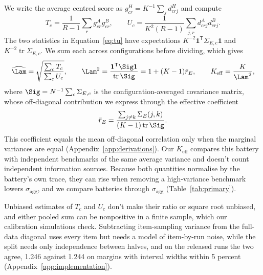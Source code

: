 We write the average centred score as $g^H_{cr}=K^{-1}\sum_j d^H_{crj}$ and compute
\begin{equation}
T_c=\frac{1}{R-1}\sum_r g^A_{cr}g^B_{cr},\qquad
U_c=\frac{1}{K^2(R-1)}\sum_{j,r}d^A_{crj}d^B_{crj}.
\label{eq:tu}
\end{equation}
The two statistics in Equation~\ref{eq:tu} have expectations $K^{-2}\mathbf{1}^{\mathsf T}\Sigma_{E,c}\mathbf{1}$ and $K^{-2}\operatorname{tr}\Sigma_{E,c}$. We sum each across configurations before dividing, which gives
\begin{equation}
\widehat\Lam=\sqrt{\frac{\sum_c T_c}{\sum_c U_c}},\qquad
\Lam^2=\frac{\mathbf{1}^{\mathsf T}\Sig\mathbf{1}}{\operatorname{tr}\Sig}
=1+(K-1)\bar r_E,\qquad K_{\mathrm{eff}}=\frac{K}{\Lam^2},
\label{eq:lambda}
\end{equation}
where $\Sig=N^{-1}\sum_c\Sigma_{E,c}$ is the configuration-averaged covariance matrix, whose off-diagonal contribution we express through the effective coefficient
\begin{equation}
\bar r_E=\frac{\sum_{j\ne k}\Sigma_E(j,k)}{(K-1)\operatorname{tr}\Sig}.
\label{eq:effective}
\end{equation}
This coefficient equals the mean off-diagonal correlation only when the marginal variances are equal (Appendix~\ref{app:derivations}). Our $K_{\mathrm{eff}}$ compares this battery with independent benchmarks of the same average variance and doesn't count independent information sources. Because both quantities normalise by the battery's own trace, they can rise when removing a high-variance benchmark lowers $\sigma_{\mathrm{agg}}$, and we compare batteries through $\sigma_{\mathrm{agg}}$ (Table~\ref{tab:primary}).

Unbiased estimates of $T_c$ and $U_c$ don't make their ratio or square root unbiased, and either pooled sum can be nonpositive in a finite sample, which our calibration simulations check. Subtracting item-sampling variance from the full-data diagonal uses every item but needs a model of item-by-run noise, while the split needs only independence between halves, and on the released runs the two agree, 1.246  against 1.244 on margins with interval widths within 5 percent (Appendix~\ref{app:implementation}).


